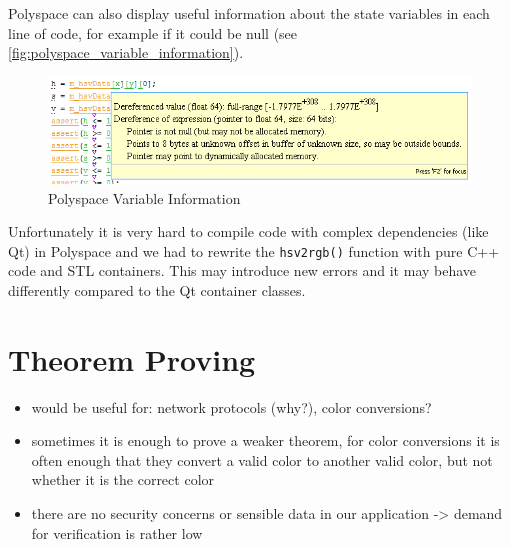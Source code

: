 \documentclass{scrreprt}
\begin{document}
Polyspace can also display useful information about the state variables in each line of code, for example if it could be null (see \vref{fig:polyspace_variable_information}).

\begin{figure}[h]
	\centering
	\includegraphics[width=1.0\textwidth]{img/polyspace_variable_information}
	\caption[Polyspace Variable Information]{Polyspace Variable Information}
	\label{fig:polyspace_variable_information}
\end{figure}

Unfortunately it is very hard to compile code with complex dependencies (like Qt) in Polyspace and we had to rewrite the \texttt{hsv2rgb()} function with pure C++ code and STL containers. This may introduce new errors and it may behave differently compared to the Qt container classes.

\section{Theorem Proving}

\begin{itemize}
	\item would be useful for: network protocols (why?), color conversions?
	\item sometimes it is enough to prove a weaker theorem, for color conversions it is often enough that they convert a valid color to another valid color, but not whether it is the correct color
	\item there are no security concerns or sensible data in our application -> demand for verification is rather low
\end{itemize}
\end{document}
